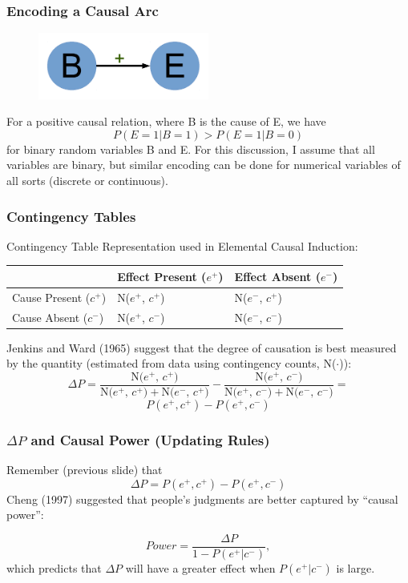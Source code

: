 \documentclass{beamer}
\begin{document}
\begin{frame}
\frametitle{Encoding a Causal Arc}
\begin{figure}

  \centering
    \includegraphics[width=0.5\textwidth]{Cause+.pdf}
\end{figure}
For a positive causal relation, where B is the cause of E, we have
$$P(E=1 | B=1) > P(E=1 | B=0)$$
for binary random variables B and E. For this discussion, I assume that all variables are binary, but similar encoding can be done for numerical variables of all sorts (discrete or continuous).
\end{frame}
 \begin{frame}
\frametitle{Contingency Tables}

Contingency Table Representation used in Elemental Causal Induction:
\begin{center}
    \begin{tabular}{l l l}
    & Effect Present ($e^+$) & Effect Absent ($e^-$) \\\hline
    Cause Present ($c^+$) & N($e^+$, $c^+$) & N($e^-$, $c^+$)  \\
    Cause Absent ($c^-$) & N($e^+$, $c^-$) & N($e^-$, $c^-$)  \\
    \hline
    \end{tabular}
\end{center}
 Jenkins and Ward (1965) suggest that the degree of causation is best measured by the quantity (estimated from data using contingency counts, N($\cdot$)):
$$\Delta P = \frac{\text{N($e^+$, $c^+$)}}{\text{N($e^+$, $c^+$)}+\text{N($e^-$, $c^+$)}}-\frac{\text{N($e^+$, $c^-$)}}{\text{N($e^+$, $c^-$)}+\text{N($e^-$, $c^-$)}}=$$
$$P(e^+, c^+)-P(e^+, c^-)$$
\end{frame}

 \begin{frame}
\frametitle{$\Delta P$ and Causal Power (Updating Rules)}
Remember (previous slide) that
$$\Delta P= P(e^+, c^+)-P(e^+, c^-)$$
Cheng (1997) suggested that people’s judgments are better captured by ``causal power'':

$$Power=\frac{\Delta P}{1-P(e^+ | c^-)},$$
which predicts that $\Delta P$ will have a greater effect when $P(e^+ | c^-)$ is large.

\end{frame}
\end{document}
